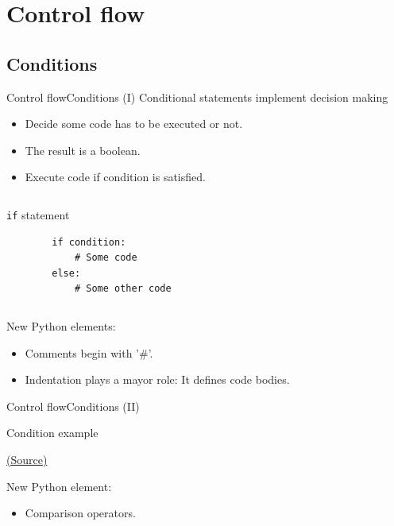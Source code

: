 \documentclass[10pt,compress]{beamer} %
\begin{document}
\section{Control flow}
\subsection{Conditions}

\begin{frame}[fragile]{Control flow}{Conditions (I)}
	Conditional statements implement decision making
	\begin{itemize}
	\item Decide some code has to be executed or not.
	\item The result is a boolean.
	\item Execute code if condition is satisfied.
	\end{itemize}

	\begin{columns}
	\begin{block}{\texttt{if} statement}
		\begin{verbatim}
		if condition:
		    # Some code
		else:
		    # Some other code
		\end{verbatim}
		\end{block}
	\end{columns}

   New Python elements:
	\begin{itemize}
	\item Comments begin with '\#'.
	\item \alert{Indentation plays a mayor role: It defines code bodies.}
	\end{itemize}
	
\end{frame}

\begin{frame}[fragile]{Control flow}{Conditions (II)}
	\begin{block}{Condition example}
	\vspace{-0.2cm}
		
	\end{block}
	\tiny{\href{http://anh.cs.luc.edu/python/hands-on/3.1/handsonHtml/ifstatements.html}{(Source)}}
	\\
	\normalsize{
	New Python element:
		\begin{itemize}
		\item Comparison operators.
		\end{itemize}
	}
\end{frame}
\end{document}
